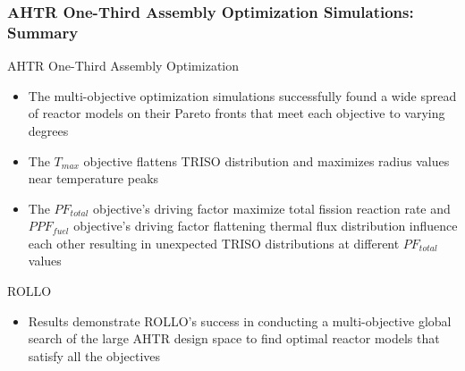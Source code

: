 \begin{frame}
    \frametitle{AHTR One-Third Assembly Optimization Simulations: Summary}
    \begin{block}{AHTR One-Third Assembly Optimization}
        \begin{itemize}
            \item The multi-objective optimization simulations successfully found a 
            wide spread of reactor models on their Pareto fronts that meet each 
            objective to varying degrees
            \item The $T_{max}$ objective flattens TRISO distribution and 
            maximizes radius values near temperature peaks 
            \item The $PF_{total}$ objective's driving factor maximize 
            total fission reaction rate and $PPF_{fuel}$ objective's driving 
            factor flattening thermal flux distribution influence each other resulting 
            in unexpected TRISO distributions at different $PF_{total}$ values 
        \end{itemize}
    \end{block}
    \begin{block}{ROLLO}
        \begin{itemize}
            \item  Results demonstrate ROLLO's success in conducting a multi-objective 
            global search of the large AHTR design space to find optimal reactor models 
            that satisfy all the objectives
        \end{itemize}
    \end{block}

\end{frame}